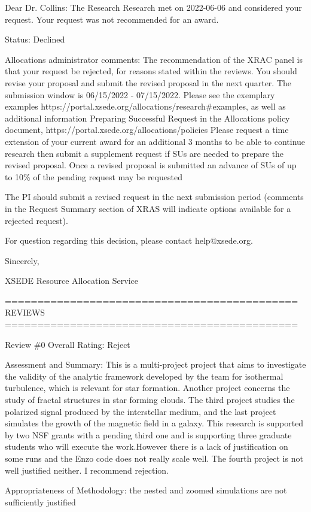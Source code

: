Dear Dr. Collins:
The Research Research met on 2022-06-06 and considered your request. Your request was not recommended for an award.

Status: Declined

Allocations administrator comments: The recommendation of the XRAC panel is that your request be rejected, for reasons stated within the reviews. You should revise your proposal and submit the revised proposal in the next quarter. The submission window is 06/15/2022 - 07/15/2022. Please see the exemplary examples https://portal.xsede.org/allocations/research\#examples, as well as additional information Preparing Successful Request in the Allocations policy document, https://portal.xsede.org/allocations/policies Please request a time extension of your current award for an additional 3 months to be able to continue research then submit a supplement request if SUs are needed to prepare the revised proposal. Once a revised proposal is submitted an advance of SUs of up to 10\% of the pending request may be requested

The PI should submit a revised request in the next submission period (comments in the Request Summary section of XRAS will
indicate options available for a rejected request).

For question regarding this decision, please contact help@xsede.org.

Sincerely,

XSEDE Resource Allocation Service 

=============================================
REVIEWS
=============================================

Review \#0
Overall Rating: Reject

Assessment and Summary: This is a multi-project project that aims to investigate the validity of the analytic framework developed by the team for isothermal turbulence, which is relevant for star formation. Another project concerns the study of fractal structures in star forming clouds. The third project studies the polarized signal produced by the interstellar medium, and the last project simulates the growth of the magnetic field in a galaxy. This research is supported by two NSF grants with a pending third one and is supporting three graduate students who will execute the work.However there is a lack of justification on some runs and the Enzo code does not really scale well. The fourth project is not well justified neither. I recommend rejection.

Appropriateness of Methodology: the nested and zoomed simulations are not sufficiently justified

